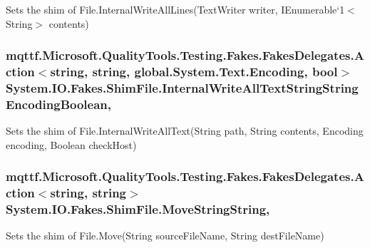 Sets the shim of File.\-Internal\-Write\-All\-Lines(Text\-Writer writer, I\-Enumerable`1$<$String$>$ contents)

\hypertarget{class_system_1_1_i_o_1_1_fakes_1_1_shim_file_a9599736d3017943dcafa9ff3998dd43c}{
\subsubsection[{Internal\-Write\-All\-Text\-String\-String\-Encoding\-Boolean}]{\setlength{\rightskip}{0pt plus 5cm}mqttf.\-Microsoft.\-Quality\-Tools.\-Testing.\-Fakes.\-Fakes\-Delegates.\-Action$<$string, string, global.\-System.\-Text.\-Encoding, bool$>$ System.\-I\-O.\-Fakes.\-Shim\-File.\-Internal\-Write\-All\-Text\-String\-String\-Encoding\-Boolean\hspace{0.3cm}{\ttfamily [static]}, {\ttfamily [set]}}}\label{class_system_1_1_i_o_1_1_fakes_1_1_shim_file_a9599736d3017943dcafa9ff3998dd43c}


Sets the shim of File.\-Internal\-Write\-All\-Text(\-String path, String contents, Encoding encoding, Boolean check\-Host)

\hypertarget{class_system_1_1_i_o_1_1_fakes_1_1_shim_file_a6face77ff415bf6ad882d0fcdf91b031}{
\subsubsection[{Move\-String\-String}]{\setlength{\rightskip}{0pt plus 5cm}mqttf.\-Microsoft.\-Quality\-Tools.\-Testing.\-Fakes.\-Fakes\-Delegates.\-Action$<$string, string$>$ System.\-I\-O.\-Fakes.\-Shim\-File.\-Move\-String\-String\hspace{0.3cm}{\ttfamily [static]}, {\ttfamily [set]}}}\label{class_system_1_1_i_o_1_1_fakes_1_1_shim_file_a6face77ff415bf6ad882d0fcdf91b031}


Sets the shim of File.\-Move(\-String source\-File\-Name, String dest\-File\-Name)

